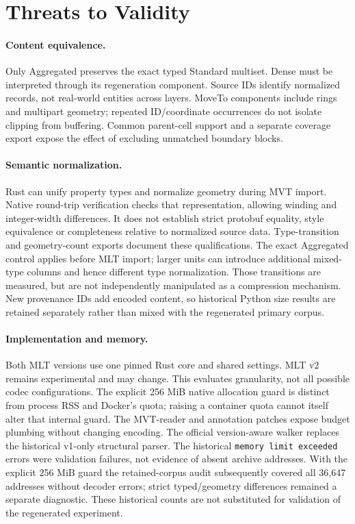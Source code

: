 \section{Threats to Validity}\label{sec:threats}
\paragraph{Content equivalence.}
Only Aggregated preserves the exact typed Standard multiset. Dense must be
interpreted through its regeneration component. Source IDs identify normalized
records, not real-world entities across layers. MoveTo components include rings and
multipart geometry; repeated ID/coordinate occurrences do not isolate clipping from
buffering. Common parent-cell support and a separate coverage export expose the
effect of excluding unmatched boundary blocks.

\paragraph{Semantic normalization.}
Rust can unify property types and normalize geometry during MVT import. Native
round-trip verification checks that representation, allowing winding and integer-width
differences. It does not establish strict protobuf equality, style equivalence or
completeness relative to normalized source data. Type-transition and geometry-count
exports document these qualifications.
The exact Aggregated control applies before MLT import; larger units can introduce
additional mixed-type columns and hence different type normalization. Those transitions
are measured, but are not independently manipulated as a compression mechanism.
New provenance IDs add encoded content, so
historical Python size results are retained separately rather than mixed with the
regenerated primary corpus.

\paragraph{Implementation and memory.}
Both MLT versions use one pinned Rust core and shared settings. MLT v2 remains
experimental and may change. This evaluates granularity, not all possible codec
configurations. The explicit 256 MiB native allocation guard is distinct from process
RSS and Docker's quota; raising a container quota cannot itself alter that internal
guard. The MVT-reader and annotation patches expose budget plumbing without changing encoding.
The official version-aware walker replaces the historical v1-only structural parser.
The historical \texttt{memory limit exceeded} errors were validation failures,
not evidence of absent archive addresses. With the explicit 256 MiB guard the retained-corpus
audit subsequently covered all 36,647 addresses without decoder errors; strict
typed/geometry differences remained a separate diagnostic. These historical
counts are not substituted for validation of the regenerated experiment.


